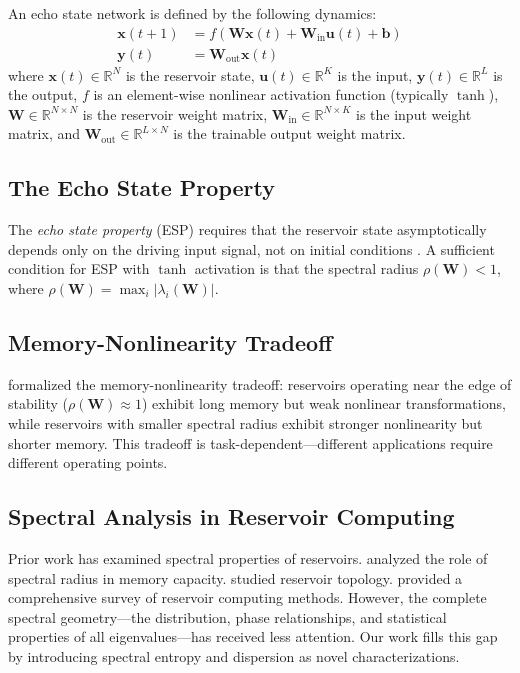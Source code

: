 \documentclass{article}
\begin{document}
An echo state network is defined by the following dynamics:
\begin{align}
\mathbf{x}(t+1) &= f(\mathbf{W} \mathbf{x}(t) + \mathbf{W}_{\text{in}} \mathbf{u}(t) + \mathbf{b}) \label{eq:esn}\\
\mathbf{y}(t) &= \mathbf{W}_{\text{out}} \mathbf{x}(t)
\end{align}
where $\mathbf{x}(t) \in \mathbb{R}^N$ is the reservoir state, $\mathbf{u}(t) \in \mathbb{R}^K$ is the input, $\mathbf{y}(t) \in \mathbb{R}^L$ is the output, $f$ is an element-wise nonlinear activation function (typically $\tanh$), $\mathbf{W} \in \mathbb{R}^{N \times N}$ is the reservoir weight matrix, $\mathbf{W}_{\text{in}} \in \mathbb{R}^{N \times K}$ is the input weight matrix, and $\mathbf{W}_{\text{out}} \in \mathbb{R}^{L \times N}$ is the trainable output weight matrix.

\subsection{The Echo State Property}

The \textit{echo state property} (ESP) requires that the reservoir state asymptotically depends only on the driving input signal, not on initial conditions \citep{jaeger2001}. A sufficient condition for ESP with $\tanh$ activation is that the spectral radius $\rho(\mathbf{W}) < 1$, where $\rho(\mathbf{W}) = \max_i |\lambda_i(\mathbf{W})|$.

\subsection{Memory-Nonlinearity Tradeoff}

\citet{dambre2012} formalized the memory-nonlinearity tradeoff: reservoirs operating near the edge of stability ($\rho(\mathbf{W}) \approx 1$) exhibit long memory but weak nonlinear transformations, while reservoirs with smaller spectral radius exhibit stronger nonlinearity but shorter memory. This tradeoff is task-dependent—different applications require different operating points.

\subsection{Spectral Analysis in Reservoir Computing}

Prior work has examined spectral properties of reservoirs. \citet{yildiz2012} analyzed the role of spectral radius in memory capacity. \citet{verstraeten2007} studied reservoir topology. \citet{lukovsevivcius2012} provided a comprehensive survey of reservoir computing methods. However, the complete spectral geometry—the distribution, phase relationships, and statistical properties of all eigenvalues—has received less attention. Our work fills this gap by introducing spectral entropy and dispersion as novel characterizations.
\end{document}
